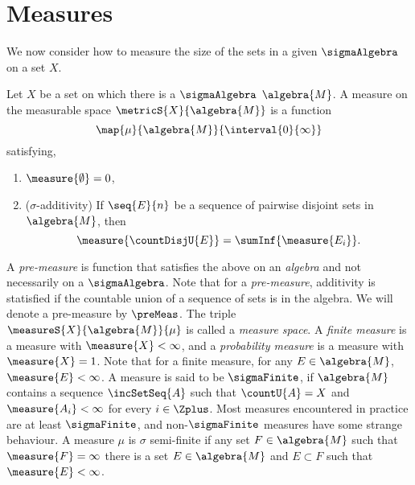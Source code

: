 \section{Measures}
We now consider how to measure the size of the sets in a given $\sigmaAlgebra$ on a set $X$.
\begin{Definition}[name=Measure]
    Let $X$ be a set on which there is a $\sigmaAlgebra$ $\algebra{M}$. A measure on the measurable
    space $\metricS{X}{\algebra{M}}$ is a function \[\map{\mu}{\algebra{M}}{\interval{0}{\infty}}\]
    satisfying,
    \begin{enumerate}
	\item
	    $\measure{\emptyset} = 0$,
	\item
	    ($\sigma$-additivity) If $\seq{E}{n}$ be a sequence of pairwise disjoint sets in 
	    $\algebra{M}$, then
	    \begin{equation*}
		\measure{\countDisjU{E}} = \sumInf{\measure{E_i}}.
	    \end{equation*}
    \end{enumerate}
\end{Definition}
A \emph{pre-measure} is function that satisfies the above on an \emph{algebra} and not necessarily
on a $\sigmaAlgebra$. Note that for a \emph{pre-measure}, additivity is statisfied if the countable
union of a sequence of sets is in the algebra. We will denote a pre-measure by $\preMeas$. 
The triple $\measureS{X}{\algebra{M}}{\mu}$ is called a \emph{measure space}.
A \emph{finite measure} is a measure with $\measure{X} < \infty$, and a \emph{probability measure}
is a measure with $\measure{X} = 1$. Note that for a finite measure, for any $E \in \algebra{M}$,
$\measure{E} < \infty$. A measure is said to be $\sigmaFinite$, if $\algebra{M}$
contains a sequence $\incSetSeq{A}$ such that $\countU{A} = X$ and $\measure{A_i} < \infty$ for
every $i \in \Zplus$. Most measures encountered in practice are at least $\sigmaFinite$, and
non-$\sigmaFinite$ measures have some strange behaviour. A measure $\mu$ is $\sigma$ semi-finite if
any set $F \in \algebra{M}$ such that $\measure{F} = \infty$ there is a set $E \in \algebra{M}$ and
$E \subset F$ such that $\measure{E} < \infty$.

